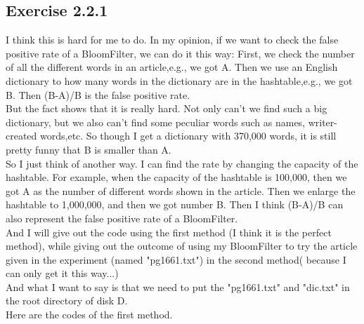 \documentclass{article}
\begin{document}
\subsection{Exercise 2.2.1}
I think this is hard for me to do. In my opinion, if we want to check the false positive rate of a BloomFilter, we can do it this way:
First, we check the number of all the different words in an article,e.g., we got A. Then we use an English dictionary to how many words in the dictionary are in the hashtable,e.g., we got B. Then (B-A)/B is the false positive rate.\\
But the fact shows that it is really hard. Not only can't we find such a big dictionary, but we also can't find some peculiar words such as names, writer-created words,etc. So though I get a dictionary with 370,000 words, it is still pretty funny that B is smaller than A.\\
So I just think of another way. I can find the rate by changing the capacity of the hashtable. For example, when the capacity of the hashtable is 100,000, then we got A as the number of different words shown in the article. Then we enlarge the hashtable to 1,000,000, and then we got number B. Then I think (B-A)/B can also represent the false positive rate of a BloomFilter.\\
And I will give out the code using the first method (I think it is the perfect method), while giving out the outcome of using my BloomFilter to try the article given in the experiment (named "pg1661.txt") in the second method( because I can only get it this way...)\\
And what I want to say is that we need to put the "pg1661.txt" and "dic.txt" in the root directory of disk D.\\
Here are the codes of the first method.\\
\end{document}
